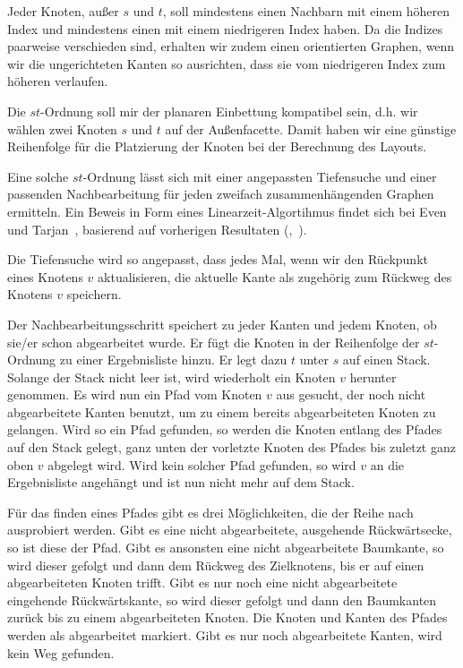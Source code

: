 \documentclass[a4paper]{scrreprt}
\theoremstyle{definition}
\begin{document}
Jeder Knoten, außer $s$ und $t$, soll mindestens einen Nachbarn mit einem höheren Index und mindestens einen mit einem niedrigeren Index haben. Da die Indizes paarweise verschieden sind, erhalten wir zudem einen orientierten Graphen, wenn wir die ungerichteten Kanten so ausrichten, dass sie vom niedrigeren Index zum höheren verlaufen.

Die $st$-Ordnung soll mir der planaren Einbettung kompatibel sein, d.h. wir wählen zwei Knoten $s$ und $t$ auf der Außenfacette. Damit haben wir eine günstige Reihenfolge für die Platzierung der Knoten bei der Berechnung des Layouts. 

Eine solche $st$-Ordnung lässt sich mit einer angepassten Tiefensuche und einer passenden Nachbearbeitung für jeden zweifach zusammenhängenden Graphen ermitteln. Ein Beweis in Form eines Linearzeit-Algortihmus findet sich bei Even und Tarjan~\cite{even+tarjan-75}, basierend auf vorherigen Resultaten (\cite{hopcroft+tarjan-74},~\cite{tarjan-72}).

Die Tiefensuche wird so angepasst, dass jedes Mal, wenn wir den Rückpunkt eines Knotens $v$ aktualisieren, die aktuelle Kante als zugehörig zum Rückweg des Knotens $v$ speichern.

Der Nachbearbeitungsschritt speichert zu jeder Kanten und jedem Knoten, ob sie/er schon abgearbeitet wurde. Er fügt die Knoten in der Reihenfolge der $st$-Ordnung zu einer Ergebnisliste hinzu. Er legt dazu $t$ unter $s$ auf einen Stack. Solange der Stack nicht leer ist, wird wiederholt ein Knoten $v$ herunter genommen. Es wird nun ein Pfad vom Knoten $v$ aus gesucht, der noch nicht abgearbeitete Kanten benutzt, um zu einem bereits abgearbeiteten Knoten zu gelangen. Wird so ein Pfad gefunden, so werden die Knoten entlang des Pfades auf den Stack gelegt, ganz unten der vorletzte Knoten des Pfades bis zuletzt ganz oben $v$ abgelegt wird. Wird kein solcher Pfad gefunden, so wird $v$ an die Ergebnisliste angehängt und ist nun nicht mehr auf dem Stack.

Für das finden eines Pfades gibt es drei Möglichkeiten, die der Reihe nach ausprobiert werden. Gibt es eine nicht abgearbeitete, ausgehende Rückwärtsecke, so ist diese der Pfad. Gibt es ansonsten eine nicht abgearbeitete Baumkante, so wird dieser gefolgt und dann dem Rückweg des Zielknotens, bis er auf einen abgearbeiteten Knoten trifft. Gibt es nur noch eine nicht abgearbeitete eingehende Rückwärtskante, so  wird dieser gefolgt und dann den Baumkanten zurück bis zu einem abgearbeiteten Knoten. Die Knoten und Kanten des Pfades werden als abgearbeitet markiert. Gibt es nur noch abgearbeitete Kanten, wird kein Weg gefunden.
\end{document}
